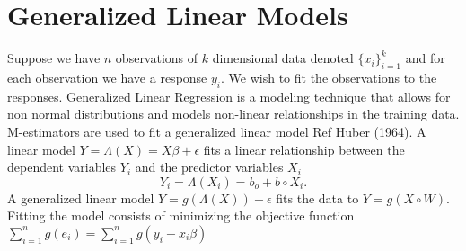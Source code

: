 \section*{Generalized Linear Models}Suppose we have $n$ observations of $k$ dimensional data denoted $\{x_i\}_{i=1}^{k}$ and for each observation we have a response $y_i$. We wish to fit the observations to the responses. Generalized Linear Regression is a modeling technique that allows for non normal distributions and models non-linear relationships in the training data. M-estimators are used to fit a generalized linear model Ref Huber (1964).
A linear model $ Y =\Lambda(X)=X\beta + \epsilon$ fits a linear relationship between the dependent variables $Y_i$ and the predictor variables $X_i$ \begin{equation}Y_i=\Lambda(X_i)=b_o + b \circ X_i.\end{equation}
A generalized linear model $Y= g(\Lambda(X) ) + \epsilon $ fits the data to $ Y = g (X \circ W)$. Fitting the model consists of minimizing the objective function $\sum\limits_{i=1}^{n} g(e_i)=\sum\limits_{i=1}^{n} g(y_i- x_i \beta)$
